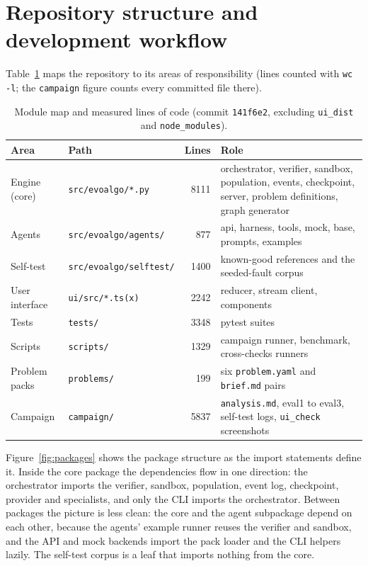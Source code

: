 \section{Repository structure and development workflow}
\label{sec:impl-repo}

Table~\ref{tab:impl-repo} maps the repository to its areas of responsibility
(lines counted with \texttt{wc -l}; the \texttt{campaign} figure counts every
committed file there).

\begin{table}[H]
\centering
\scriptsize
\setlength{\tabcolsep}{4pt}
\caption{Module map and measured lines of code (commit \texttt{141f6e2}, excluding
\texttt{ui\_dist} and \texttt{node\_modules}).}
\label{tab:impl-repo}
\begin{tabular}{@{}p{}p{}rp{}@{}}
\toprule
Area & Path & Lines & Role \\
\midrule
Engine (core) & \texttt{src/evoalgo/*.py} & 8111 & orchestrator, verifier,
sandbox, population, events, checkpoint, server, problem definitions, graph
generator \\
Agents & \texttt{src/evoalgo/agents/} & 877 & api, harness, tools, mock,
base, prompts, examples \\
Self-test & \texttt{src/evoalgo/selftest/} & 1400 & known-good references and
the seeded-fault corpus \\
User interface & \texttt{ui/src/*.ts(x)} & 2242 & reducer, stream client, components \\
Tests & \texttt{tests/} & 3348 & pytest suites \\
Scripts & \texttt{scripts/} & 1329 & campaign runner, benchmark, cross-checks
runners \\
Problem packs & \texttt{problems/} & 199 & six \texttt{problem.yaml} and
\texttt{brief.md} pairs \\
Campaign & \texttt{campaign/} & 5837 & \texttt{analysis.md}, eval1 to eval3,
self-test logs, \texttt{ui\_check} screenshots \\
\bottomrule
\end{tabular}
\end{table}

Figure~\ref{fig:packages} shows the package structure as the import statements
define it. Inside the core package the dependencies flow in one direction: the
orchestrator imports the verifier, sandbox, population, event log, checkpoint,
provider and specialists, and only the CLI imports the orchestrator. Between
packages the picture is less clean: the core and the agent subpackage depend on
each other, because the agents' example runner reuses the verifier and sandbox,
and the API and mock backends import the pack loader and the CLI helpers lazily.
The self-test corpus is a leaf that imports nothing from the core.

